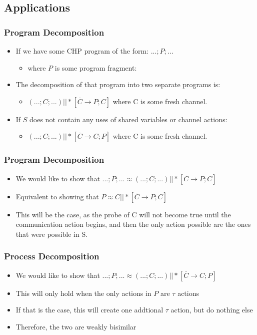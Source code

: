 \documentclass[compress]{beamer}
\begin{document}
\subsection{Applications}
\begin{frame}
\frametitle{Program Decomposition}
\begin{itemize}
\item If we have some CHP program of the form: $...;P;...$
\begin{itemize}
\item where $P$ is some program fragment:
\end{itemize}
\item The decomposition of that program into two separate programs is:
\begin{itemize}
\item $(...;C;...) || *[\overline{C} \rightarrow P; C] $ where C is some fresh channel.
\end{itemize}
\item If $S$ does not contain any uses of shared variables or channel actions:
\begin{itemize}
\item$(...;C;...) || *[\overline{C} \rightarrow C; P] $ where C is some fresh channel.
\end{itemize}
\end{itemize}
\end{frame}
\begin{frame}
\frametitle{Program Decomposition}
\begin{itemize}
\item We would like to show that $ ...;P;... \approx (...;C;...) || *[\overline{C} \rightarrow P; C]$
\pause
\item Equivalent to showing that $P \approx C || *[\overline{C} \rightarrow P; C]$
\pause
\item This will be the case, as the probe of C will not become true until the communication action begins, and then the only action possible are the ones that were possible in S.
\end{itemize}
\end{frame}
\begin{frame}
\frametitle{Process Decomposition}
\begin{itemize}
\item We would like to show that $ ...;P;... \approx (...;C;...) || *[\overline{C} \rightarrow C; P]$
\pause
\item This will only hold when the only actions in $P$ are $\tau$ actions
\pause
\item If that is the case, this will create one addtional $\tau$ action, but do nothing else
\pause
\item Therefore, the two are weakly bisimilar
\end{itemize}
\end{frame}
\end{document}
